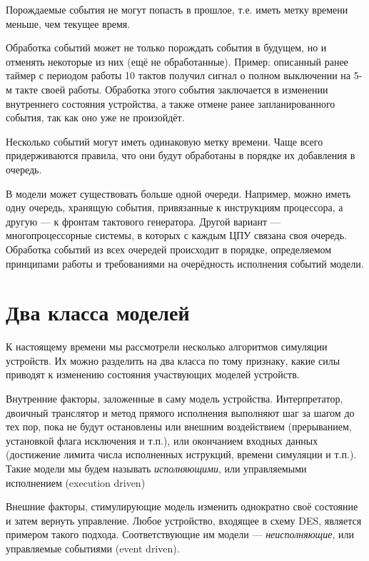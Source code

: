 \begin{itemize*}
\item Порождаемые события не могут попасть в прошлое, т.е. иметь метку времени меньше, чем текущее время.

\item Обработка событий может не только порождать события в будущем, но и отменять некоторые из них (ещё не обработанные). Пример: описанный ранее таймер с периодом работы 10 тактов получил сигнал о  полном выключении на 5-м такте своей работы. Обработка этого события заключается в изменении внутреннего состояния устройства, а также отмене ранее запланированного события, так как оно уже не произойдёт.

\item Несколько событий могут иметь одинаковую метку времени. Чаще всего придерживаются правила, что они будут обработаны в порядке их добавления в очередь.

\item В модели может существовать больше одной очереди. Например, можно иметь одну очередь, хранящую события, привязанные к инструкциям процессора, а другую --- к фронтам  тактового генератора. Другой вариант --- многопроцессорные системы, в которых с каждым ЦПУ связана своя очередь. Обработка событий из всех очередей происходит в порядке, определяемом принципами работы и требованиями на очерёдность исполнения событий модели.
\end{itemize*}

\section[Два класса моделей]{Два класса моделей}

К настоящему времени мы рассмотрели несколько алгоритмов симуляции устройств. Их можно разделить на два класса по тому признаку, какие силы приводят к изменению состояния участвующих моделей устройств.

\begin{enumerate*}
    \item Внутренние факторы, заложенные в саму модель устройства. Интерпретатор, двоичный транслятор и метод прямого исполнения выполняют шаг за шагом до тех пор, пока не будут остановлены или внешним воздействием (прерыванием, установкой флага исключения и т.п.), или окончанием входных данных (достижение лимита числа исполненных иструкций, времени симуляции и т.п.). Такие модели мы будем называть \textit{исполняющими}, или управляемыми исполнением (\abbr execution driven)
    \item Внешние факторы, стимулирующие модель изменить однократно своё состояние и затем вернуть управление. Любое устройство, входящее в схему DES, является примером такого подхода. Соответствующие им модели --- \textit{неисполняющие}, или управляемые событиями (\abbr event driven).
\end{enumerate*}

